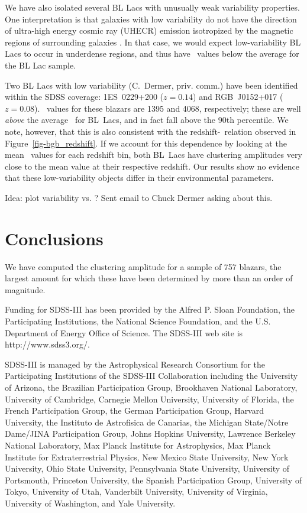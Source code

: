 \documentclass{emulateapj}
\begin{document}
We have also isolated several BL Lacs with unusually weak variability properties. One interpretation is that galaxies with low variability do not have the direction of ultra-high energy cosmic ray (UHECR) emission isotropized by the magnetic regions of surrounding galaxies \citep{raz12}. In that case, we would expect low-variability BL Lacs to occur in underdense regions, and thus have \bgb~values below the average for the BL Lac sample.  

Two BL Lacs with low variability (C.~Dermer, priv. comm.) have been identified within the SDSS coverage: 1ES~0229+200 ($z=0.14$) and RGB~J0152+017 ($z=0.08$). \bgb~values for these blazars are 1395 and 4068, respectively; these are well {\it above} the average \bgb~for BL~Lacs, and in fact fall above the 90th percentile. We note, however, that this is also consistent with the redshift-\bgb~relation observed in Figure~\ref{fig-bgb_redshift}. If we account for this dependence by looking at the mean \bgb~values for each redshift bin, both BL~Lacs have clustering amplitudes very close to the mean value at their respective redshift. Our results show no evidence that these low-variability objects differ in their environmental parameters.  

Idea: plot variability vs. \bgb? Sent email to Chuck Dermer asking about this. 


\section{Conclusions}\label{sec_conclusions}

We have computed the clustering amplitude for a sample of 757 blazars, the largest amount for which these have been determined by more than an order of magnitude. 


\acknowledgments
Funding for SDSS-III has been provided by the Alfred P. Sloan Foundation, the Participating Institutions, the National Science Foundation, and the U.S. Department of Energy Office of Science. The SDSS-III web site is http://www.sdss3.org/.

SDSS-III is managed by the Astrophysical Research Consortium for the Participating Institutions of the SDSS-III Collaboration including the University of Arizona, the Brazilian Participation Group, Brookhaven National Laboratory, University of Cambridge, Carnegie Mellon University, University of Florida, the French Participation Group, the German Participation Group, Harvard University, the Instituto de Astrofisica de Canarias, the Michigan State/Notre Dame/JINA Participation Group, Johns Hopkins University, Lawrence Berkeley National Laboratory, Max Planck Institute for Astrophysics, Max Planck Institute for Extraterrestrial Physics, New Mexico State University, New York University, Ohio State University, Pennsylvania State University, University of Portsmouth, Princeton University, the Spanish Participation Group, University of Tokyo, University of Utah, Vanderbilt University, University of Virginia, University of Washington, and Yale University.
\\




\end{document}
